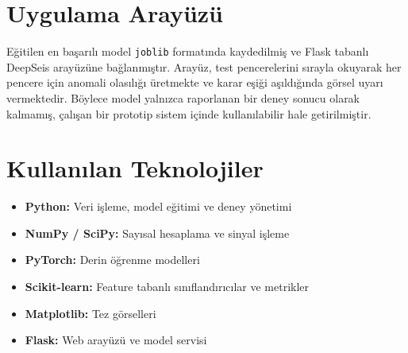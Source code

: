 \section{Uygulama Arayüzü}

Eğitilen en başarılı model \texttt{joblib} formatında kaydedilmiş ve Flask tabanlı DeepSeis arayüzüne bağlanmıştır. Arayüz, test pencerelerini sırayla okuyarak her pencere için anomali olasılığı üretmekte ve karar eşiği aşıldığında görsel uyarı vermektedir. Böylece model yalnızca raporlanan bir deney sonucu olarak kalmamış, çalışan bir prototip sistem içinde kullanılabilir hale getirilmiştir.

\section{Kullanılan Teknolojiler}

\begin{itemize}
    \item \textbf{Python:} Veri işleme, model eğitimi ve deney yönetimi
    \item \textbf{NumPy / SciPy:} Sayısal hesaplama ve sinyal işleme
    \item \textbf{PyTorch:} Derin öğrenme modelleri
    \item \textbf{Scikit-learn:} Feature tabanlı sınıflandırıcılar ve metrikler
    \item \textbf{Matplotlib:} Tez görselleri
    \item \textbf{Flask:} Web arayüzü ve model servisi
\end{itemize}
